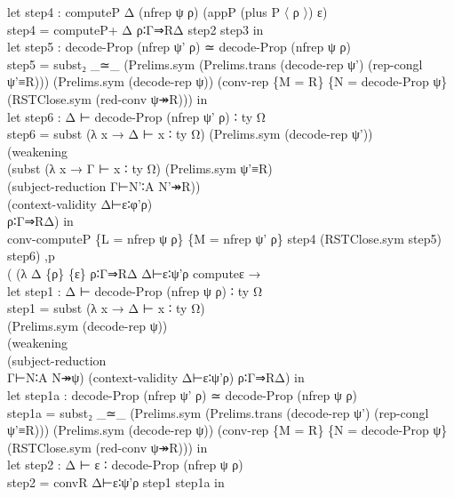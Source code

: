 \begin{proposition}
\begin{enumerate}
{\begin{code}
{\>      let step4 : computeP Δ (nfrep ψ ρ) (appP (plus P 〈 ρ 〉) ε)\<\\
\>          step4 = computeP+ Δ ρ∶Γ⇒RΔ step2 step3 in \<\\
\>      let step5 : decode-Prop (nfrep ψ' ρ) ≃ decode-Prop (nfrep ψ ρ)\<\\
\>          step5 = subst₂ \_≃\_ (Prelims.sym (Prelims.trans (decode-rep ψ') (rep-congl ψ'≡R))) (Prelims.sym (decode-rep ψ)) (conv-rep \{M = R\} \{N = decode-Prop ψ\} \<\\
\>            (RSTClose.sym (red-conv ψ↠R))) in\<\\
\>      let step6 : Δ ⊢ decode-Prop (nfrep ψ' ρ) ∶ ty Ω\<\\
\>          step6 = subst (λ x → Δ ⊢ x ∶ ty Ω) (Prelims.sym (decode-rep ψ')) \<\\
\>                (weakening \<\\
\>                  (subst (λ x → Γ ⊢ x ∶ ty Ω) (Prelims.sym ψ'≡R) \<\\
\>                  (subject-reduction Γ⊢N'∶A N'↠R)) \<\\
\>                (context-validity Δ⊢ε∶φ'ρ) \<\\
\>                ρ∶Γ⇒RΔ) in\<\\
\>      conv-computeP \{L = nfrep ψ ρ\} \{M = nfrep ψ' ρ\} step4 (RSTClose.sym step5) step6) ,p \<\\
\>    (    (λ Δ \{ρ\} \{ε\} ρ∶Γ⇒RΔ Δ⊢ε∶ψ'ρ computeε → \<\\
\>      let step1 : Δ ⊢ decode-Prop (nfrep ψ ρ) ∶ ty Ω\<\\
\>          step1 = subst (λ x → Δ ⊢ x ∶ ty Ω) \<\\
\>            (Prelims.sym (decode-rep ψ)) \<\\
\>            (weakening \<\\
\>              (subject-reduction \<\\
\>                Γ⊢N∶A N↠ψ) (context-validity Δ⊢ε∶ψ'ρ) ρ∶Γ⇒RΔ) in\<\\
\>      let step1a : decode-Prop (nfrep ψ' ρ) ≃ decode-Prop (nfrep ψ ρ)\<\\
\>          step1a = subst₂ \_≃\_ (Prelims.sym (Prelims.trans (decode-rep ψ') (rep-congl ψ'≡R))) (Prelims.sym (decode-rep ψ)) (conv-rep \{M = R\} \{N = decode-Prop ψ\} \<\\
\>            (RSTClose.sym (red-conv ψ↠R))) in \<\\
\>      let step2 : Δ ⊢ ε ∶ decode-Prop (nfrep ψ ρ)\<\\
\>          step2 = convR Δ⊢ε∶ψ'ρ step1 step1a in\<\\
}
\end{code}}
\end{enumerate}
\end{proposition}
